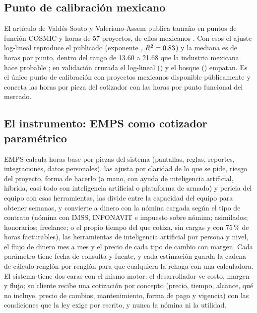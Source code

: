 \documentclass[10pt,twocolumn]{article}
\begin{document}



\subsection{Punto de calibración mexicano}
El artículo de Valdés-Souto y Valeriano-Assem publica tamaño en puntos de función COSMIC y horas de 57 proyectos, \nuevoMexN{} de ellos mexicanos \cite{valdessouto2024merging}. Con esos \nuevoMexN{} el ajuste log-lineal reproduce el publicado (exponente \nuevoMexExponente{}, $R^2=0.83$) y la mediana es de \nuevoMexHorasCFP{} horas por punto, dentro del rango de 13.60 a 21.68 que la industria mexicana hace probable \cite{valdessouto2019validation}; en validación cruzada el log-lineal (\nuevoMexSAloglin{}) y el bosque (\nuevoMexSAbosque{}) empatan. Es el único punto de calibración con proyectos mexicanos disponible públicamente y conecta las horas por pieza del cotizador con las horas por punto funcional del mercado.




\subsection{El instrumento: EMPS como cotizador paramétrico}
EMPS calcula horas base por piezas del sistema (pantallas, reglas, reportes, integraciones, datos personales), las ajusta por claridad de lo que se pide, riesgo del proyecto, forma de hacerlo (a mano, con ayuda de inteligencia artificial, híbrida, casi todo con inteligencia artificial o plataforma de armado) y pericia del equipo con esas herramientas, las divide entre la capacidad del equipo para obtener semanas, y convierte a dinero con la nómina cargada según el tipo de contrato (nómina con IMSS, INFONAVIT e impuesto sobre nómina; asimilados; honorarios; freelance; o el propio tiempo del que cotiza, sin cargas y con 75\,\% de horas facturables), las herramientas de inteligencia artificial por persona y nivel, el flujo de dinero mes a mes y el precio de cada tipo de cambio con margen. Cada parámetro tiene fecha de consulta y fuente, y cada estimación guarda la cadena de cálculo renglón por renglón para que cualquiera la rehaga con una calculadora. El sistema tiene dos caras con el mismo motor: el desarrollador ve costo, margen y flujo; su cliente recibe una cotización por concepto (precio, tiempo, alcance, qué no incluye, precio de cambios, mantenimiento, forma de pago y vigencia) con las condiciones que la ley exige por escrito, y nunca la nómina ni la utilidad.
\end{document}
